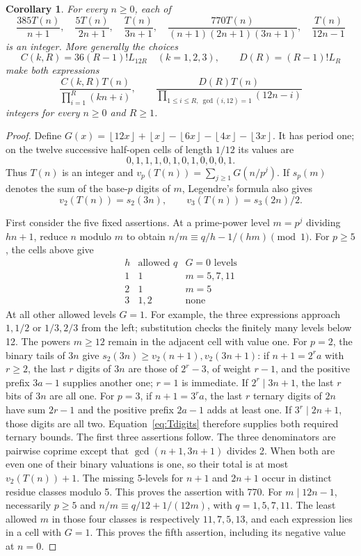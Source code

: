\documentclass[11pt]{article}
\newtheorem{corollary}[theorem]{Corollary}
\newcommand{\fl}[1]{\left\lfloor #1\right\rfloor}
\begin{document}
\begin{corollary}\label{cor:families}
For every $n\geq0$, each of
\[
 \frac{385T(n)}{n+1},\quad \frac{5T(n)}{2n+1},\quad
 \frac{T(n)}{3n+1},\quad
 \frac{770T(n)}{(n+1)(2n+1)(3n+1)},\quad
 \frac{T(n)}{12n-1}
\]
is an integer. More generally the choices
\[
 C(k,R)=36(R-1)!L_{12R}\quad(k=1,2,3),\qquad
 D(R)=(R-1)!L_R
\]
make both expressions
\[
 \frac{C(k,R)T(n)}{\prod_{i=1}^R(kn+i)},\qquad
 \frac{D(R)T(n)}{\prod_{1\leq i\leq R,\ \gcd(i,12)=1}(12n-i)}
\]
integers for every $n\geq0$ and $R\geq1$.
\end{corollary}
\begin{proof}
Define $G(x)=\fl{12x}+\fl{x}-\fl{6x}-\fl{4x}-\fl{3x}$.
It has period one; on the twelve successive half-open cells of
length $1/12$ its values are
\[
 0,1,1,1,0,1,0,1,0,0,0,1.
\]
Thus $T(n)$ is an integer and $v_p(T(n))=\sum_{j\geq1}G(n/p^j)$.
If $s_p(m)$ denotes the sum of the base-$p$ digits of $m$,
Legendre's formula also gives
\begin{equation}\label{eq:Tdigits}
 v_2(T(n))=s_2(3n),\qquad v_3(T(n))=s_3(2n)/2.
\end{equation}

First consider the five fixed assertions. At a prime-power level
$m=p^j$ dividing $hn+1$, reduce $n$ modulo $m$ to obtain
$n/m\equiv q/h-1/(hm)\pmod1$. For $p\geq5$, the cells above give
\[
\begin{array}{c|c|c}
h&\text{allowed }q&G=0\text{ levels}\\\hline
1&1&m=5,7,11\\
2&1&m=5\\
3&1,2&\text{none}
\end{array}
\]
At all other allowed levels $G=1$. For example, the three expressions
approach $1,1/2$ or $1/3,2/3$ from the left; substitution checks
the finitely many levels below 12. The powers $m\geq12$ remain
in the adjacent cell with value one.
For $p=2$, the binary tails of $3n$ give
$s_2(3n)\geq v_2(n+1),v_2(3n+1)$:
if $n+1=2^ra$ with $r\geq2$, the last $r$ digits of $3n$
are those of $2^r-3$, of weight $r-1$, and the positive prefix
$3a-1$ supplies another one; $r=1$ is immediate.
If $2^r\mid3n+1$, the last $r$ bits of $3n$ are all one.
For $p=3$, if $n+1=3^ra$, the last $r$ ternary digits of $2n$
have sum $2r-1$ and the positive prefix $2a-1$ adds at least one.
If $3^r\mid2n+1$, those digits are all two. Equation~\eqref{eq:Tdigits}
therefore supplies both required ternary bounds.
The first three assertions follow. The three denominators are
pairwise coprime except that $\gcd(n+1,3n+1)$ divides 2.
When both are even one of their binary valuations is one, so their
total is at most $v_2(T(n))+1$. The missing $5$-levels for
$n+1$ and $2n+1$ occur in distinct residue classes modulo 5.
This proves the assertion with 770.
For $m\mid12n-1$, necessarily $p\geq5$ and
$n/m\equiv q/12+1/(12m)$, with $q=1,5,7,11$.
The least allowed $m$ in those four classes is respectively
$11,7,5,13$, and each expression lies in a cell with $G=1$.
This proves the fifth assertion, including its negative value at $n=0$.


\end{proof}
\end{document}
